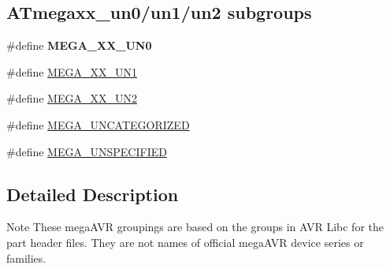 \subsection*{A\-Tmegaxx\-\_\-un0/un1/un2 subgroups}
\begin{DoxyCompactItemize}
\item 
\#define {\bfseries M\-E\-G\-A\-\_\-\-X\-X\-\_\-\-U\-N0}
\item 
\#define \hyperlink{group__mega__part__macros__group_gaad35e34280ef078dec0cc18c3ea6d3f6}{M\-E\-G\-A\-\_\-\-X\-X\-\_\-\-U\-N1}
\item 
\#define \hyperlink{group__mega__part__macros__group_ga5f4566d4ddaa3cee92d4c78162594f2d}{M\-E\-G\-A\-\_\-\-X\-X\-\_\-\-U\-N2}
\item 
\#define \hyperlink{group__mega__part__macros__group_ga9252d02a9216d5e9bf94000667ad6cb1}{M\-E\-G\-A\-\_\-\-U\-N\-C\-A\-T\-E\-G\-O\-R\-I\-Z\-E\-D}
\item 
\#define \hyperlink{group__mega__part__macros__group_gaabb3078f36ad4d875915bd54fa46f337}{M\-E\-G\-A\-\_\-\-U\-N\-S\-P\-E\-C\-I\-F\-I\-E\-D}
\end{DoxyCompactItemize}


\subsection{Detailed Description}
\begin{DoxyNote}{Note}
These mega\-A\-V\-R groupings are based on the groups in A\-V\-R Libc for the part header files. They are not names of official mega\-A\-V\-R device series or families. 
\end{DoxyNote}


